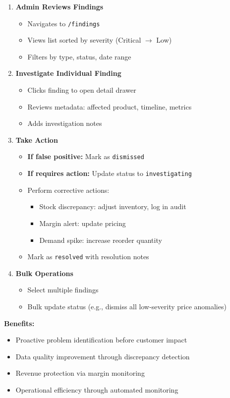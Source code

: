 \begin{enumerate}[leftmargin=*]
    \item \textbf{Admin Reviews Findings}
    \begin{itemize}
        \item Navigates to \texttt{/findings}
        \item Views list sorted by severity (Critical $\rightarrow$ Low)
        \item Filters by type, status, date range
    \end{itemize}
    
    \item \textbf{Investigate Individual Finding}
    \begin{itemize}
        \item Clicks finding to open detail drawer
        \item Reviews metadata: affected product, timeline, metrics
        \item Adds investigation notes
    \end{itemize}
    
    \item \textbf{Take Action}
    \begin{itemize}
        \item \textbf{If false positive:} Mark as \texttt{dismissed}
        \item \textbf{If requires action:} Update status to \texttt{investigating}
        \item Perform corrective actions:
        \begin{itemize}
            \item Stock discrepancy: adjust inventory, log in audit
            \item Margin alert: update pricing
            \item Demand spike: increase reorder quantity
        \end{itemize}
        \item Mark as \texttt{resolved} with resolution notes
    \end{itemize}
    
    \item \textbf{Bulk Operations}
    \begin{itemize}
        \item Select multiple findings
        \item Bulk update status (e.g., dismiss all low-severity price anomalies)
    \end{itemize}
\end{enumerate}

\textbf{Benefits:}
\begin{itemize}
    \item Proactive problem identification before customer impact
    \item Data quality improvement through discrepancy detection
    \item Revenue protection via margin monitoring
    \item Operational efficiency through automated monitoring
\end{itemize}
